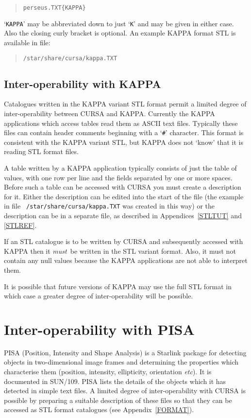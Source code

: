 \documentclass[twoside,11pt]{article}
\newcommand{\xref}[3]{#1}
\newcommand{\xlabel}[1]{}
\renewcommand{\_}{\texttt{\symbol{95}}}
\begin{document}
\begin{verse}
{\tt perseus.TXT\{KAPPA\}}
\end{verse}

`{\tt KAPPA}' may be abbreviated down to just `{\tt K}' and may be given
in either case.  Also the closing curly bracket is optional.  An example
KAPPA format STL is available in file:

\begin{verse}
{\tt /star/share/cursa/kappa.TXT}
\end{verse}

\subsection{Inter-operability with KAPPA}

Catalogues written in the KAPPA variant STL format permit a limited
degree of inter-operability between CURSA and KAPPA.  Currently the
KAPPA applications which access tables read them as ASCII text files.
Typically these files can contain header comments beginning with a
`{\tt \#}' character.  This format is consistent with the KAPPA variant
STL, but KAPPA does not `know' that it is reading STL format files.

A table written by a KAPPA application typically consists of just the
table of values, with one row per line and the fields separated by one
or more spaces.  Before such a table can be accessed with CURSA you must
create a description for it.  Either the description can be edited into
the start of the file (the example in file {\tt
/star/share/cursa/kappa.TXT} was created in this way) or the
description can be in a separate file, as described in
Appendices~\ref{STLTUT} and \ref{STLREF}.

If an STL catalogue is to be written by CURSA and subsequently accessed
with KAPPA then it {\it must}\, be written in the STL variant format.
Also, it must not contain any null values because the KAPPA applications
are not able to interpret them.

It is possible that future versions of KAPPA may use the full STL format
in which case a greater degree of inter-operability will be possible.


\section{\xlabel{PISA}\label{PISA}Inter-operability with PISA}

PISA (Position, Intensity and Shape Analysis) is a Starlink package for
detecting objects in two-dimensional image frames and determining
the properties which characterise them (position, intensity, ellipticity,
orientation \emph{etc}\/).  It is documented in
\xref{SUN/109}{sun109}{}\cite{SUN109}.  PISA lists the details of the
objects which it has detected in simple text files.  A limited degree of
inter-operability with CURSA is possible by preparing a suitable description
of these files so that they can be accessed as STL format catalogues (see
Appendix~\ref{FORMAT}).
\end{document}
